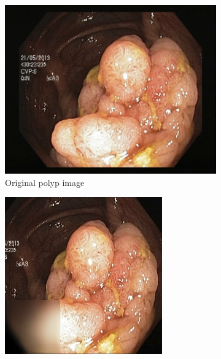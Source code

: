 \begin{figure}[h]
                \tiny
        \begin{subfigure}[t]{\myfigsizethree}
            \centering
            \includegraphics[height=\textwidth ,width=\textwidth]{experiments/figures/greensquare/polypORIG.png}
            \caption{Original polyp image }   
            \label{fig:polyp_ORIG_SQUARE1}
        \end{subfigure}
        \qquad
        \begin{subfigure}[t]{\myfigsizethree}
            \centering
            \includegraphics[width=\textwidth]{experiments/figures/greensquare/polypAE.png}

\end{subfigure}
\end{figure}
